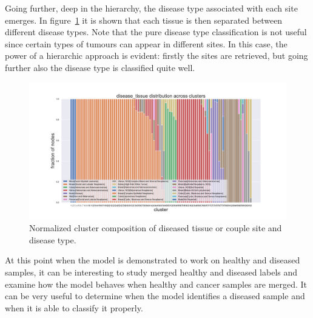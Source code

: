Going further, deep in the hierarchy, the disease type associated with each site emerges. In figure~\ref{fig:topic/tcga/fraction_clustercomposition_l2_disease_tissue} it is shown that each tissue is then separated between different disease types. Note that the pure disease type classification is not useful since certain types of tumours can appear in different sites. In this case, the power of a hierarchic approach is evident: firstly the sites are retrieved, but going further also the disease type is classified quite well.
\begin{figure}[htb!]
	\centering
	\includegraphics[width=0.9\linewidth]{pictures/topic/tcga/fraction_clustercomposition_l2_disease_tissue.pdf}
	\caption{Normalized cluster composition of diseased tissue or couple site and disease type.}
	\label{fig:topic/tcga/fraction_clustercomposition_l2_disease_tissue}
\end{figure}
\FloatBarrier
At this point when the model is demonstrated to work on healthy and diseased samples, it can be interesting to study merged healthy and diseased labels and examine how the model behaves when healthy and cancer samples are merged. It can be very useful to determine when the model identifies a diseased sample and when it is able to classify it properly.